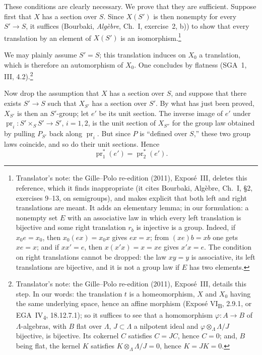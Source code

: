 These conditions are clearly necessary. We prove that they are
sufficient. Suppose first that \(X\) has a section over \(S\). Since
\(X(S')\) is then nonempty for every \(S'\to S\), it suffices (Bourbaki,
\emph{Algèbre}, Ch.~I, exercise~2, b)) to show that every translation by an
element of \(X(S')\) is an isomorphism.\footnote{Translator's note: the Gille--Polo re-edition (2011), Exposé~III, deletes this
reference, which it finds inappropriate (it cites Bourbaki, Algèbre, Ch.~I,
\S2, exercises 9--13, on semigroups), and makes explicit that both left and
right translations are meant. It adds an elementary lemma; in our
formulation: a nonempty set \(E\) with an associative law in which every left
translation is bijective and some right translation \(r_b\) is injective is a
group. Indeed, if \(x_0e=x_0\), then \(x_0(ex)=x_0x\) gives \(ex=x\); from
\((xe)b=xb\) one gets \(xe=x\); and if \(xx'=e\), then \(x(x'x)=x=xe\) gives
\(x'x=e\). The condition on right translations cannot be dropped: the law
\(xy=y\) is associative, its left translations are bijective, and it is not a
group law if \(E\) has two elements.}

We may plainly assume \(S'=S\); this translation induces on \(X_0\) a
translation, which is therefore an automorphism of \(X_0\). One concludes by
flatness (SGA~1, III, 4.2).\footnote{Translator's note: the Gille--Polo re-edition (2011), Exposé~III, details this step. In our
words: the translation \(t\) is a homeomorphism, \(X\) and \(X_0\) having the
same underlying space, hence an affine morphism (Exposé VI\textsubscript{B},
2.9.1, or EGA~IV\textsubscript{4}, 18.12.7.1); so it suffices to see that a
homomorphism \(\varphi\colon A\to B\) of \(\Lambda\)-algebras, with \(B\) flat
over \(\Lambda\), \(J\subset\Lambda\) a nilpotent ideal and
\(\varphi\otimes_\Lambda\Lambda/J\) bijective, is bijective. Its cokernel
\(C\) satisfies \(C=JC\), hence \(C=0\); and, \(B\) being flat, the kernel
\(K\) satisfies \(K\otimes_\Lambda\Lambda/J=0\), hence \(K=JK=0\).}

Now drop the assumption that \(X\) has a section over \(S\), and
suppose that there exists \(S'\to S\) such that \(X_{S'}\) has a
section over \(S'\). By what has just been proved, \(X_{S'}\) is then an
\(S'\)-group; let \(e'\) be its unit section. The inverse image of
\(e'\) under
\(\operatorname{pr}_i:S'\times_S S'\to S'\), \(i=1,2\), is the unit
section of \(X_{S''}\) for the group law obtained by pulling
\(P_{S'}\) back along \(\operatorname{pr}_i\). But since \(P\) is
``defined over \(S\),'' these two group laws coincide, and so do their
unit sections. Hence
\[
 \operatorname{pr}_1^*(e')=\operatorname{pr}_2^*(e').
\]

